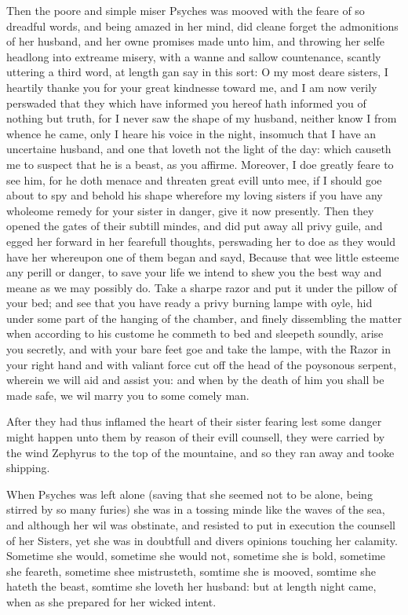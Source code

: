 Then the poore and simple miser Psyches was mooved with the feare of so
dreadful words, and being amazed in her mind, did cleane forget the admonitions
of her husband, and her owne promises made unto him, and throwing her selfe
headlong into extreame misery, with a wanne and sallow countenance, scantly
uttering a third word, at length gan say in this sort: O my most deare sisters,
I heartily thanke you for your great kindnesse toward me, and I am now verily
perswaded that they which have informed you hereof hath informed you of nothing
but truth, for I never saw the shape of my husband, neither know I from whence
he came, only I heare his voice in the night, insomuch that I have an
uncertaine husband, and one that loveth not the light of the day: which causeth
me to suspect that he is a beast, as you affirme. Moreover, I doe greatly feare
to see him, for he doth menace and threaten great evill unto mee, if I should
goe about to spy and behold his shape wherefore my loving sisters if you have
any wholeome remedy for your sister in danger, give it now presently. Then they
opened the gates of their subtill mindes, and did put away all privy guile, and
egged her forward in her fearefull thoughts, perswading her to doe as they
would have her whereupon one of them began and sayd, Because that wee little
esteeme any perill or danger, to save your life we intend to shew you the best
way and meane as we may possibly do. Take a sharpe razor and put it under the
pillow of your bed; and see that you have ready a privy burning lampe with
oyle, hid under some part of the hanging of the chamber, and finely dissembling
the matter when according to his custome he commeth to bed and sleepeth
soundly, arise you secretly, and with your bare feet goe and take the lampe,
with the Razor in your right hand and with valiant force cut off the head of
the poysonous serpent, wherein we will aid and assist you: and when by the
death of him you shall be made safe, we wil marry you to some comely man.

After they had thus inflamed the heart of their sister fearing lest some danger
might happen unto them by reason of their evill counsell, they were carried by
the wind Zephyrus to the top of the mountaine, and so they ran away and tooke
shipping.

When Psyches was left alone (saving that she seemed not to be alone, being
stirred by so many furies) she was in a tossing minde like the waves of the
sea, and although her wil was obstinate, and resisted to put in execution the
counsell of her Sisters, yet she was in doubtfull and divers opinions touching
her calamity. Sometime she would, sometime she would not, sometime she is bold,
sometime she feareth, sometime shee mistrusteth, somtime she is mooved, somtime
she hateth the beast, somtime she loveth her husband: but at length night came,
when as she prepared for her wicked intent.

